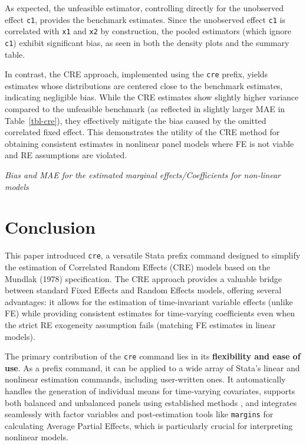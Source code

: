 \documentclass[bib]{statapress}
\begin{document}
As expected, the unfeasible estimator, controlling directly for the
unobserved effect \texttt{c1}, provides the benchmark estimates. Since
the unobserved effect \texttt{c1} is correlated with \texttt{x1} and
\texttt{x2} by construction, the pooled estimators (which ignore
\texttt{c1}) exhibit significant bias, as seen in both the density plots
and the summary table.

In contrast, the CRE approach, implemented using the \texttt{cre}
prefix, yields estimates whose distributions are centered close to the
benchmark estimates, indicating negligible bias. While the CRE estimates
show slightly higher variance compared to the unfeasible benchmark (as
reflected in slightly larger MAE in Table~\ref{tbl-cre}), they
effectively mitigate the bias caused by the omitted correlated fixed
effect. This demonstrates the utility of the CRE method for obtaining
consistent estimates in nonlinear panel models where FE is not viable
and RE assumptions are violated.

\begin{table}[H]

\caption{\label{tbl-cre}\emph{Bias and MAE for the estimated marginal
effects/Coefficients for non-linear models}}


\end{table}%

\section{Conclusion}\label{sec-6}

This paper introduced \texttt{cre}, a versatile Stata prefix command
designed to simplify the estimation of Correlated Random Effects (CRE)
models based on the Mundlak (1978) specification. The CRE approach
provides a valuable bridge between standard Fixed Effects and Random
Effects models, offering several advantages: it allows for the
estimation of time-invariant variable effects (unlike FE) while
providing consistent estimates for time-varying coefficients even when
the strict RE exogeneity assumption fails (matching FE estimates in
linear models).

The primary contribution of the \texttt{cre} command lies in its
\textbf{flexibility and ease of use}. As a prefix command, it can be
applied to a wide array of Stata's linear and nonlinear estimation
commands, including user-written ones. It automatically handles the
generation of individual means for time-varying covariates, supports
both balanced and unbalanced panels using established methods
\citep{wooldridge2019}, and integrates seamlessly with factor variables
and post-estimation tools like \texttt{margins} for calculating Average
Partial Effects, which is particularly crucial for interpreting
nonlinear models.
\end{document}
